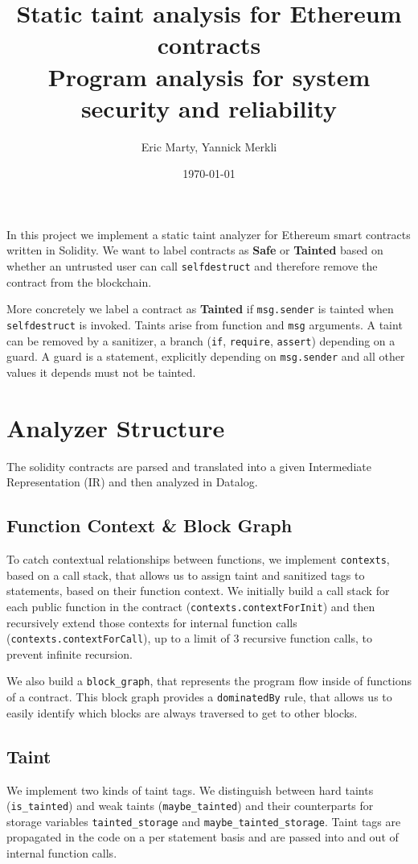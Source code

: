 \documentclass[11pt,a4paper]{article}
\title{Static taint analysis for Ethereum contracts \\ \large Program analysis for system security and reliability}
\author{Eric Marty, Yannick Merkli}
\date{\today}
\begin{document}
\maketitle
{}
\setlength\parindent{0pt}

In this project we implement a static taint analyzer for Ethereum smart contracts written in Solidity.
We want to label contracts as \textbf{Safe} or \textbf{Tainted} based on whether an untrusted user can call \lstinline{selfdestruct} and therefore remove the contract from the blockchain.

More concretely we label a contract as \textbf{Tainted} if \lstinline{msg.sender} is tainted when \lstinline{selfdestruct} is invoked.
Taints arise from function and \lstinline{msg} arguments.
A taint can be removed by a sanitizer, a branch (\lstinline{if}, \lstinline{require}, \lstinline{assert}) depending on a guard.
A guard is a statement, explicitly depending on \lstinline{msg.sender} and all other values it depends must not be tainted.

\section{Analyzer Structure}
The solidity contracts are parsed and translated into a given Intermediate Representation (IR) and then analyzed in Datalog.

\subsection{Function Context \& Block Graph}
To catch contextual relationships between functions, we implement \lstinline{contexts}, based on a call stack, that allows us to assign taint and sanitized tags to statements, based on their function context.
We initially build a call stack for each public function in the contract (\lstinline{contexts.contextForInit}) and then recursively extend those contexts for internal function calls (\lstinline{contexts.contextForCall}), up to a limit of 3 recursive function calls, to prevent infinite recursion.



We also build a \lstinline{block_graph}, that represents the program flow inside of functions of a contract.
This block graph provides a \lstinline{dominatedBy} rule, that allows us to easily identify which blocks are always traversed to get to other blocks.

\subsection{Taint}
We implement two kinds of taint tags.
We distinguish between hard taints (\lstinline{is_tainted}) and weak taints (\lstinline{maybe_tainted}) and their counterparts for storage variables \lstinline{tainted_storage} and \lstinline{maybe_tainted_storage}.
Taint tags are propagated in the code on a per statement basis and are passed into and out of internal function calls.
\end{document}
